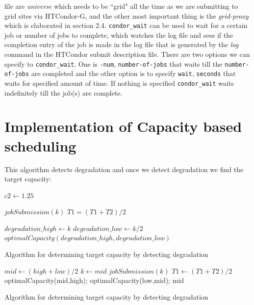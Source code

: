 \documentclass[ms,electronic,double]{nuthesis}
\begin{document}
file are \emph{universe} which needs to be ``grid" all the time as we are submitting 
to grid sites via HTCondor-G, and the other most important thing is the \emph{grid-proxy} which is elaborated in section 2.4. 
\texttt{condor\_wait} \cite{manual56} can be used to wait for a certain job or 
number of jobs to complete, which watches the log file and sees if the completion 
entry of the job is made in the log file that is generated by the \emph{log} 
command in the HTCondor submit description file. There are two options we can 
specify to \texttt{condor\_wait}. One is \texttt{-num}, \texttt{number-of-jobs} that waits
till the \texttt{number-of-jobs} are completed and the other option is to specify \texttt{wait}, \texttt{seconds} that 
waits for specified amount of time. If nothing is specified \texttt{condor\_wait} waits indefinitely till
the job(s) are complete.

\section{Implementation of Capacity based scheduling}

This algorithm detects degradation and once we detect degradation we find the 
target capacity:

\begin{algorithm}
\begin{algorithmic}
\STATE $c2 \gets 1.25$ 

  \STATE $jobSubmission(k)$ 
  \STATE $T1=(T1+T2)/2$
\ENDIF

  \STATE $degradation\_high \gets k$
  \STATE $degradation\_low \gets k/2$
  \STATE $optimalCapacity(degradation\_high,degradation\_low)$
\ENDIF

\ENDWHILE

\end{algorithmic}
\caption{Algorithm for determining target capacity by detecting degradation}
\label{alg:Degradation Detection}
\end{algorithm}


\begin{algorithm}
\begin{algorithmic}

\STATE $mid \gets (high+low)/2$ 
\STATE $k \gets mid$
\STATE $jobSubmission(k)$ 
\STATE $T1 \gets (T1+T2)/2$
\STATE optimalCapacity(mid,high);
\ENDIF  
{}
\STATE optimalCapacity(low,mid);
\ENDIF
\RETURN mid
\end{algorithmic}
\caption{Algorithm for determining target capacity by detecting degradation}
\label{alg:optimalCapacity(high,low)}
\end{algorithm}
\end{document}
